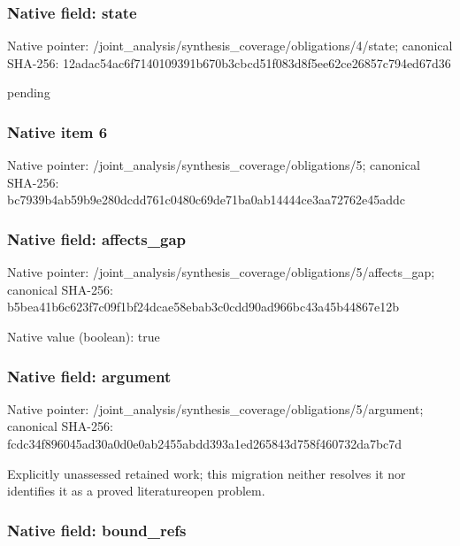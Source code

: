 \documentclass[10pt,a4paper]{article}
\begin{document}
\subsubsection{Native field: state}


Native pointer: /joint\_analysis/synthesi\allowbreak{}s\_coverage/obligations/4\allowbreak{}/state; canonical SHA-256: 12adac54ac6f7140109391b6\allowbreak{}70b3cbcd51f083d8f5ee62ce\allowbreak{}26857c794ed67d36


pending


\subsubsection{Native item 6}


Native pointer: /joint\_analysis/synthesi\allowbreak{}s\_coverage/obligations/5; canonical SHA-256: bc7939b4ab59b9e280dcdd76\allowbreak{}1c0480c69de71ba0ab14444c\allowbreak{}e3aa72762e45addc



\subsubsection{Native field: affects\_gap}


Native pointer: /joint\_analysis/synthesi\allowbreak{}s\_coverage/obligations/5\allowbreak{}/affects\_gap; canonical SHA-256: b5bea41b6c623f7c09f1bf24\allowbreak{}dcae58ebab3c0cdd90ad966b\allowbreak{}c43a45b44867e12b



Native value (boolean): true



\subsubsection{Native field: argument}


Native pointer: /joint\_analysis/synthesi\allowbreak{}s\_coverage/obligations/5\allowbreak{}/argument; canonical SHA-256: fcdc34f896045ad30a0d0e0a\allowbreak{}b2455abdd393a1ed265843d7\allowbreak{}58f460732da7bc7d


Explicitly unassessed retained work; this migration neither resolves it nor identifies it as a proved literatureopen problem.


\subsubsection{Native field: bound\_refs}
\end{document}
